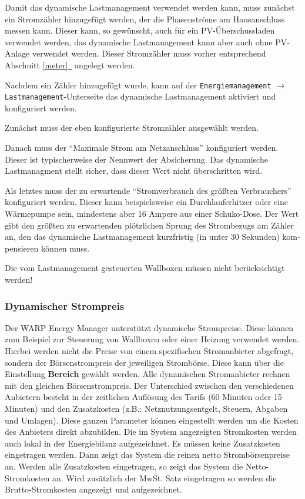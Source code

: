 \documentclass[a4paper,10pt]{article}
\newcommand{\hint}[1]{\begin{tcolorbox}[colback=boxgray,colframe=black,coltext=
white,title=Hinweis,left*=2mm,right*=2mm,boxsep=1mm,bottom=1mm,top=1mm]#1\end{tcolorbox}}
\newcommand*{\fullref}[1]{Abschnitt \hyperref[{#1}]{\ref*{#1}~\nameref*{#1}}}
\begin{document}
\begin{multicols*}{2}
    Damit das dynamische Lastmanagement verwendet werden kann, muss zunächst ein
    Stromzähler hinzugefügt werden, der die Phasenströme am Hausanschluss messen kann.
    Dieser kann, so gewünscht, auch für ein PV-Überschussladen verwendet werden,
    das dynamische Lastmanagement kann aber auch ohne PV-Anlage verwendet werden. Dieser Stromzähler muss vorher entsprechend \fullref{meter} angelegt werden.

    Nachdem ein Zähler hinzugefügt wurde, kann auf der \texttt{Energiemanagement} $\rightarrow$ \texttt{Lastmanagement}-Unterseite das dynamische Lastmanagement aktiviert und konfiguriert werden.

    Zunächst muss der eben konfigurierte Stromzähler ausgewählt werden.

    Danach muss der \enquote{Maximale Strom am Netzanschluss} konfiguriert werden. Dieser ist typischerweise der Nennwert der Absicherung. 
    Das dynamische Lastmanagment stellt sicher, dass dieser Wert nicht überschritten wird.

    Als letztes muss der zu erwartende \enquote{Stromverbrauch des größten Verbrauchers} konfiguriert werden. 
    Dieser kann beispielsweise ein Durchlauferhitzer oder eine Wärmepumpe sein, mindestens aber 16 Ampere aus einer Schuko-Dose. 
    Der Wert gibt den größten zu er­war­ten­den plötz­li­chen Sprung des Strom­bezugs am Zähler an, den das dy­na­mi­sche Last­manage­ment kurz­fris­tig (in unter 30 Sekunden) kom­pen­sieren können muss.

    \hint{Die vom Last­manage­ment ge­steu­er­ten Wallboxen müssen nicht be­rück­sich­tigt werden!}


    \subsubsection{Dynamischer Strompreis}
    Der WARP Energy Manager unterstützt dynamische Strompreise. Diese können zum Beispiel zur Steuerung von Wallboxen oder einer Heizung verwendet werden.
    Hierbei werden nicht die Preise von einem spezifischen Stromanbieter abgefragt, sondern der Börsenstrompreis der jeweiligen Strombörse.
    Diese kann über die Einstellung \textbf{Bereich} gewählt werden. Alle dynamischen Stromanbieter rechnen mit den gleichen Börsenstrompreis. Der Unterschied zwischen den verschiedenen Anbietern besteht 
    in der zeitlichen Auflösung des Tarifs (60 Minuten oder 15 Minuten) und den Zusatzkosten (z.B.: Netznutzungsentgelt, Steuern, Abgaben und Umlagen). Diese ganzen Parameter können eingestellt werden um
    die Kosten des Anbieters direkt abzubilden. Die im System angezeigten Stromkosten werden auch lokal in der Energiebilanz aufgezeichnet. Es müssen keine Zusatzkosten eingetragen werden. 
    Dann zeigt das System die reinen netto Strombörsenpreise an. Werden alle Zusatzkosten eingetragen, so zeigt das System die Netto-Stromkosten an. Wird zusätzlich der MwSt. Satz eingetragen so
    werden die Brutto-Stromkosten angezeigt und aufgezeichnet.
    

\end{multicols*}
\end{document}
